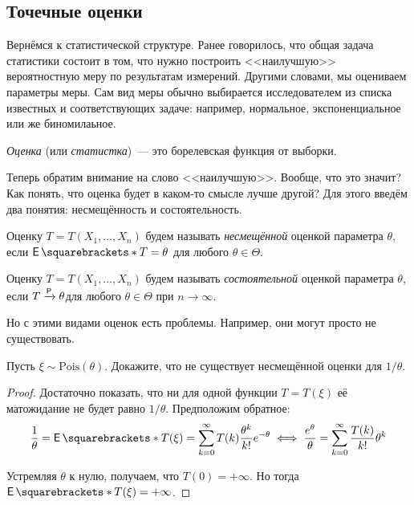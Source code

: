 \subsection{Точечные оценки}
Вернёмся к статистической структуре. Ранее говорилось, что общая задача 
статистики состоит в том, что нужно построить <<наилучшую>> вероятностную меру 
по результатам измерений. Другими словами, мы оцениваем параметры меры. Сам вид 
меры обычно выбирается исследователем из списка известных и соответствующих 
задаче: например, нормальное, экспоненциальное или же биномилаьное.
\begin{definition}
	\emph{Оценка} (или \emph{статистка})~--- это борелевская функция от выборки.
\end{definition}

Теперь обратим внимание на слово <<наилучшую>>. Вообще, что это значит? Как 
понять, что оценка будет в каком-то смысле лучше другой? Для этого введём два 
понятия: несмещённость и состоятельность.
\begin{definition}
	Оценку \(T = T(X_{1}, \dots, X_{n})\) будем называть \emph{несмещённой} 
	оценкой параметра \(\theta\), если \(\E{T} = \theta\) для любого \(\theta 
	\in \Theta\).
\end{definition}
\begin{definition}
	Оценку \(T = T(X_{1}, \dots, X_{n})\) будем называть \emph{состоятельной} 
	оценкой параметра \(\theta\), если \(T \prto \theta\)для любого \(\theta 
	\in \Theta\) при \(n \to \infty\).
\end{definition}

Но с этими видами оценок есть проблемы. Например, они могут просто не 
существовать.
\begin{problem}
	Пусть \(\xi \sim \mathrm{Pois}(\theta)\). Докажите, что не существует 
	несмещённой оценки для \(1/\theta\).
\end{problem}
\begin{proof}
	Достаточно показать, что ни для одной функции \(T = T(\xi)\) её матожидание 
	не будет равно \(1/\theta\). Предположим обратное:
	\[
		\frac{1}{\theta} = \E{T(\xi)} = \sum_{k = 0}^{\infty} 
		T(k)\frac{\theta^{k}}{k!}e^{-\theta} \iff \frac{e^{\theta}}{\theta} = 
		\sum_{k = 0}^{\infty} 
		\frac{T(k)}{k!}\theta^{k}
	\]
	
	Устремляя \(\theta\) к нулю, получаем, что \(T(0) = +\infty\). Но тогда 
	\(\E{T(\xi)} = +\infty\).
\end{proof}